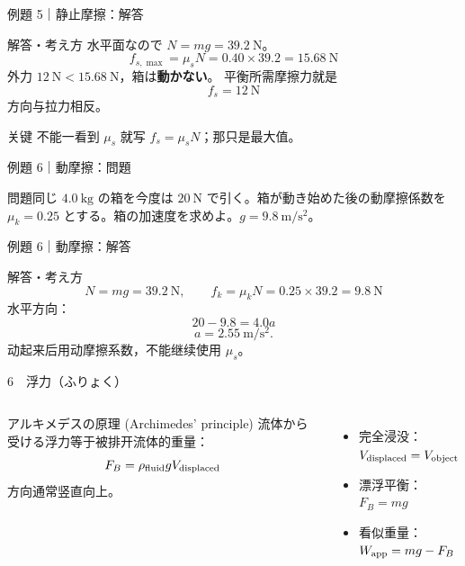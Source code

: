 \documentclass[notheorems,aspectratio=169]{beamer}
\newcommand{\key}[1]{\textbf{\color{ChinaRed}#1}}
\newcommand{\en}[1]{\textcolor{GraphGray}{\scriptsize(#1)}}
\newcommand{\qcard}[1]{%
  \begin{block}{問題}\centering\large #1\end{block}}
\newcommand{\acard}[1]{%
  \begin{exampleblock}{解答・考え方}#1\end{exampleblock}}
\newcommand{\forcearrow}[5]{%
  \draw[-{Latex[length=3mm]},very thick,#5] (#1,#2)--++(#3,#4);}
\begin{document}
\begin{frame}{例題 5｜静止摩擦：解答}
\acard{
水平面なので $N=mg=39.2\ \mathrm N$。
\[
f_{s,\max}=\mu_sN=0.40\times39.2=15.68\ \mathrm N
\]
外力 $12\ \mathrm N<15.68\ \mathrm N$，箱は\key{動かない}。
平衡所需摩擦力就是
\[
\boxed{f_s=12\ \mathrm N}
\]
方向与拉力相反。}
\begin{alertblock}{关键}
不能一看到 $\mu_s$ 就写 $f_s=\mu_sN$；那只是最大值。
\end{alertblock}
\end{frame}

\begin{frame}{例題 6｜動摩擦：問題}
\vfill
\qcard{同じ $4.0\ \mathrm{kg}$ の箱を今度は $20\ \mathrm N$ で引く。箱が動き始めた後の動摩擦係数を $\mu_k=0.25$ とする。箱の加速度を求めよ。$g=9.8\ \mathrm{m/s^2}$。}
\vfill
\end{frame}

\begin{frame}{例題 6｜動摩擦：解答}
\acard{
\[
N=mg=39.2\ \mathrm N,\qquad
f_k=\mu_kN=0.25\times39.2=9.8\ \mathrm N
\]
水平方向：
\[
20-9.8=4.0a
\]
\[
a=\boxed{2.55\ \mathrm{m/s^2}}.
\]
动起来后用动摩擦系数，不能继续使用 $\mu_s$。}
\end{frame}

\begin{frame}{6　浮力（ふりょく）}
\begin{columns}[c]
\begin{block}{アルキメデスの原理 \en{Archimedes' principle}}
流体から受ける浮力等于被排开流体的重量：
\[
F_B=\rho_{\rm fluid}gV_{\rm displaced}
\]
方向通常竖直向上。
\end{block}
\begin{itemize}
  \item 完全浸没：$V_{\rm displaced}=V_{\rm object}$
  \item 漂浮平衡：$F_B=mg$
  \item 看似重量：$W_{\rm app}=mg-F_B$
\end{itemize}
\centering
{}
\end{columns}
\end{frame}
\end{document}
